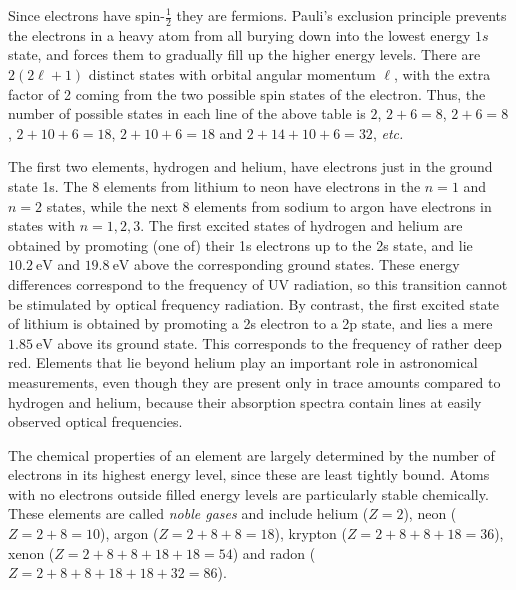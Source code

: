 \documentclass{article}
\theoremstyle{plain}\theoremheaderfont{\normalfont\itshape}\theorembodyfont{\rmfamily}\theoremseparator{.}\newtheorem*{rem}{Remark}\newtheorem*{ex}{Example}\newtheorem*{proof}{Proof}\newtheorem*{altp}{Alternative proof}
\theoremstyle{plain}\theoremheaderfont{\normalfont\bfseries}\theorembodyfont{\rmfamily}\theoremseparator{.}\newtheorem{thm}{Theorem}[section]\newtheorem{lem}[thm]{Lemma}\newtheorem{prop}[thm]{Proposition}\newtheorem*{cor}{Corollary}\newtheorem{defn}[thm]{Definition}\newtheorem{clm}[thm]{Claim}\newtheorem{clminproof}{Claim}
\theoremstyle{break}\theoremheaderfont{\normalfont\itshape}\theorembodyfont{\rmfamily}\theoremseparator{.\medskip}\newtheorem*{proofskip}{Proof}\newtheorem*{exs}{Examples}\newtheorem*{rems}{Remarks}
\theoremstyle{break}\theoremheaderfont{\normalfont\bfseries}\theorembodyfont{\rmfamily}\theoremseparator{.\medskip}\newtheorem{lemskip}[thm]{Lemma}\newtheorem{defnskip}[thm]{Definition}\newtheorem{propskip}[thm]{Proposition}\newtheorem{thmskip}[thm]{Theorem}
\numberwithin{equation}{section}
\newcommand{\unit}[1]{\ \mathrm{#1}}
\begin{document}
    Since electrons have spin-\(\frac{1}{2}\) they are fermions. Pauli's exclusion principle prevents the electrons in a heavy atom from all burying down into the lowest energy \(1s\) state, and forces them to gradually fill up the higher energy levels. There are \(2(2\ell+1)\) distinct states with orbital angular momentum \(\ell\), with the extra factor of 2 coming from the two possible spin states of the electron. Thus, the number of possible states in each line of the above table is \(2\), \(2+6=8\), \(2+6=8\), \(2+10+6=18\), \(2+10+6=18\) and \(2+14+10+6=32\), \textit{etc.}

    The first two elements, hydrogen and helium, have electrons just in the ground state 1s. The 8 elements from lithium to neon have electrons in the \(n=1\) and \(n=2\) states, while the next 8 elements from sodium to argon have electrons in states with \(n=1,2,3\). The first excited states of hydrogen and helium are obtained by promoting (one of) their 1s electrons up to the 2s state, and lie \(10.2\unit{eV}\) and \(19.8\unit{eV}\) above the corresponding ground states. These energy differences correspond to the frequency of UV radiation, so this transition cannot be stimulated by optical frequency radiation. By contrast, the first excited state of lithium is obtained by promoting a 2s electron to a 2p state, and lies a mere \(1.85\unit{eV}\) above its ground state. This corresponds to the frequency of rather deep red. Elements that lie beyond helium play an important role in astronomical measurements, even though they are present only in trace amounts compared to hydrogen and helium, because their absorption spectra contain lines at easily observed optical frequencies.

    The chemical properties of an element are largely determined by the number of electrons in its highest energy level, since these are least tightly bound. Atoms with no electrons outside filled energy levels are particularly stable chemically. These elements are called \textit{noble gases} and include helium (\(Z=2\)), neon (\(Z=2+8=10\)), argon (\(Z=2+8+8=18\)), krypton (\(Z=2+8+8+18=36\)), xenon (\(Z=2+8+8+18+18=54\)) and radon (\(Z=2+8+8+18+18+32=86\)).
\end{document}
